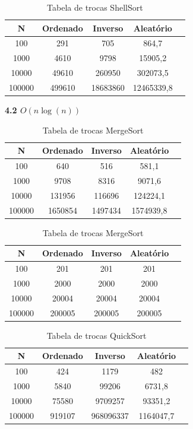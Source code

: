 \documentclass[10pt]{article}
\begin{document}
\begin{table}[H]
  \centering
  \caption{Tabela de trocas ShellSort}
  \begin{tabular}{|c|c|c|c|c|}
  \hline
  N & Ordenado & Inverso & Aleatório \\ \hline
  100 & 291 & 705 & 864,7 \\ \hline
  1000 & 4610 & 9798 & 15905,2 \\ \hline
  10000 & 49610 & 260950 & 302073,5 \\ \hline
  100000 & 499610 & 18683860 & 12465339,8 \\ \hline
  \end{tabular}
\end{table}

\vspace{0.5cm}

\textbf{4.2 $O(n \log(n))$}

\begin{table}[H]
  \parbox{.45\linewidth}{
    \centering
    \caption{Tabela de trocas HeapSort}
    \begin{tabular}{|c|c|c|c|c|}
    \hline
    N & Ordenado & Inverso & Aleatório \\ \hline
    100 & 640 & 516 & 581,1 \\ \hline
    1000 & 9708 & 8316 & 9071,6 \\ \hline
    10000 & 131956 & 116696 & 124224,1 \\ \hline
    100000 & 1650854 & 1497434 & 1574939,8 \\ \hline
    \end{tabular}
  }
  \hfill
  \parbox{.45\linewidth}{
    \centering
    \caption{Tabela de trocas MergeSort}
    \begin{tabular}{|c|c|c|c|c|}
    \hline
    N & Ordenado & Inverso & Aleatório \\ \hline
    100 & 201 & 201 & 201 \\ \hline
    1000 & 2000 & 2000 & 2000 \\ \hline
    10000 & 20004 & 20004 & 20004 \\ \hline
    100000 & 200005 & 200005 & 200005 \\ \hline
    \end{tabular}
  }
\end{table}

\begin{table}[H]
  \centering
  \caption{Tabela de trocas QuickSort}
  \begin{tabular}{|c|c|c|c|c|}
  \hline
  N & Ordenado & Inverso & Aleatório \\ \hline
  100 & 424 & 1179 & 482 \\ \hline
  1000 & 5840 & 99206 & 6731,8 \\ \hline
  10000 & 75580 & 9709257 & 93351,2 \\ \hline
  100000 & 919107 & 968096337 & 1164047,7 \\ \hline
  \end{tabular}
\end{table}
\end{document}

